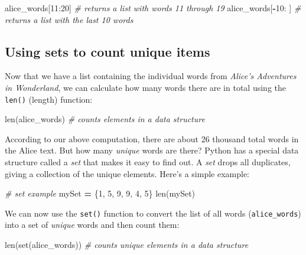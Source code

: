 \documentclass[
]{book}
\newenvironment{Shaded}{\begin{snugshade}}{\end{snugshade}}
\newcommand{\BuiltInTok}[1]{#1}
\newcommand{\CommentTok}[1]{\textcolor[rgb]{0.56,0.35,0.01}{\textit{#1}}}
\newcommand{\DecValTok}[1]{\textcolor[rgb]{0.00,0.00,0.81}{#1}}
\newcommand{\NormalTok}[1]{#1}
\newcommand{\OperatorTok}[1]{\textcolor[rgb]{0.81,0.36,0.00}{\textbf{#1}}}
\begin{document}
\begin{Shaded}
\begin{Highlighting}[]
\NormalTok{alice_words[}\DecValTok{11}\NormalTok{:}\DecValTok{20}\NormalTok{] }\CommentTok{# returns a list with words 11 through 19}
\NormalTok{alice_words[}\OperatorTok{-}\DecValTok{10}\NormalTok{: ] }\CommentTok{# returns a list with the last 10 words}
\end{Highlighting}
\end{Shaded}

\hypertarget{using-sets-to-count-unique-items}{%
\subsection{Using sets to count unique items}\label{using-sets-to-count-unique-items}}

Now that we have a list containing the individual words from \emph{Alice's Adventures in Wonderland}, we can calculate how many words there are in total using the \texttt{len()} (length) function:

\begin{Shaded}
\begin{Highlighting}[]
\BuiltInTok{len}\NormalTok{(alice_words) }\CommentTok{# counts elements in a data structure}
\end{Highlighting}
\end{Shaded}

According to our above computation, there are about 26 thousand total words in the Alice text. But how many \emph{unique} words are there? Python has a special data structure called a \emph{set} that makes it easy to find out. A \emph{set} drops all duplicates, giving a collection of the unique elements. Here's a simple example:

\begin{Shaded}
\begin{Highlighting}[]
\CommentTok{# set example}
\NormalTok{mySet }\OperatorTok{=}\NormalTok{ \{}\DecValTok{1}\NormalTok{, }\DecValTok{5}\NormalTok{, }\DecValTok{9}\NormalTok{, }\DecValTok{9}\NormalTok{, }\DecValTok{4}\NormalTok{, }\DecValTok{5}\NormalTok{\}}
\BuiltInTok{len}\NormalTok{(mySet)}
\end{Highlighting}
\end{Shaded}

We can now use the \texttt{set()} function to convert the list of all words (\texttt{alice\_words}) into a set of \emph{unique} words and then count them:

\begin{Shaded}
\begin{Highlighting}[]
\BuiltInTok{len}\NormalTok{(}\BuiltInTok{set}\NormalTok{(alice_words)) }\CommentTok{# counts unique elements in a data structure}
\end{Highlighting}
\end{Shaded}
\end{document}
